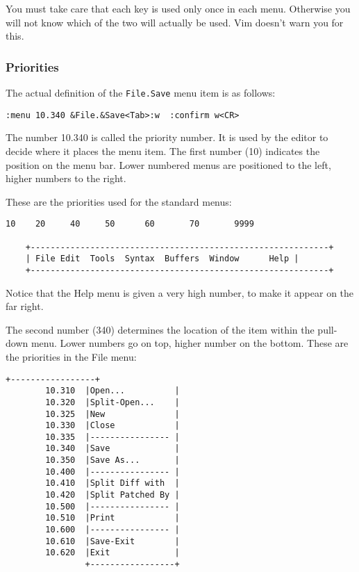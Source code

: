 You must take care that each key is used only once in each menu.
Otherwise you will not know which of the two will actually be used.
Vim doesn't warn you for this.

\subsubsection{Priorities}
The actual definition of the \verb!File.Save! menu item is as follows:

\begin{Verbatim}[samepage=true]
 :menu 10.340 &File.&Save<Tab>:w  :confirm w<CR>
\end{Verbatim}

The number 10.340 is called the priority number.
It is used by the editor to decide where it places the menu item.
The first number (10) indicates the position on the menu bar.
Lower numbered menus are positioned to the left, higher numbers to the right.

These are the priorities used for the standard menus:

\begin{Verbatim}[samepage=true]
      10    20     40     50      60       70       9999

    +------------------------------------------------------------+
    | File Edit  Tools  Syntax  Buffers  Window      Help |
    +------------------------------------------------------------+
\end{Verbatim}

Notice that the Help menu is given a very high number, to make it appear on the far right.

The second number (340) determines the location of the item within the pull-down menu.
Lower numbers go on top, higher number on the bottom.
These are the priorities in the File menu:

\begin{Verbatim}[samepage=true]
                +-----------------+
        10.310  |Open...          |
        10.320  |Split-Open...    |
        10.325  |New              |
        10.330  |Close            |
        10.335  |---------------- |
        10.340  |Save             |
        10.350  |Save As...       |
        10.400  |---------------- |
        10.410  |Split Diff with  |
        10.420  |Split Patched By |
        10.500  |---------------- |
        10.510  |Print            |
        10.600  |---------------- |
        10.610  |Save-Exit        |
        10.620  |Exit             |
                +-----------------+
\end{Verbatim}


